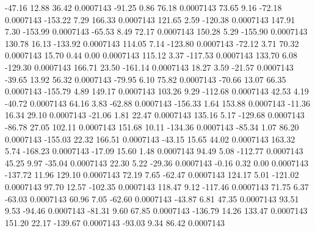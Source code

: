       -47.16       12.88       36.42     0.0007143
      -91.25        0.86       76.18     0.0007143
       73.65        9.16      -72.18     0.0007143
     -153.22        7.29      166.33     0.0007143
      121.65        2.59     -120.38     0.0007143
      147.91        7.30     -153.99     0.0007143
      -65.53        8.49       72.17     0.0007143
      150.28        5.29     -155.90     0.0007143
      130.78       16.13     -133.92     0.0007143
      114.05        7.14     -123.80     0.0007143
      -72.12        3.71       70.32     0.0007143
       15.70        0.44        0.00     0.0007143
      115.12        3.37     -117.53     0.0007143
      133.70        6.08     -129.30     0.0007143
      166.71       23.50     -161.14     0.0007143
       18.27        3.59      -21.57     0.0007143
      -39.65       13.92       56.32     0.0007143
      -79.95        6.10       75.82     0.0007143
      -70.66       13.07       66.35     0.0007143
     -155.79        4.89      149.17     0.0007143
      103.26        9.29     -112.68     0.0007143
       42.53        4.19      -40.72     0.0007143
       64.16        3.83      -62.88     0.0007143
     -156.33        1.64      153.88     0.0007143
      -11.36       16.34       29.10     0.0007143
      -21.06        1.81       22.47     0.0007143
      135.16        5.17     -129.68     0.0007143
      -86.78       27.05      102.11     0.0007143
      151.68       10.11     -134.36     0.0007143
      -85.34        1.07       86.20     0.0007143
     -155.03       22.32      166.51     0.0007143
      -43.15       15.65       44.02     0.0007143
      163.32        5.74     -168.23     0.0007143
      -17.09       15.60        1.48     0.0007143
       94.49        5.08     -112.77     0.0007143
       45.25        9.97      -35.04     0.0007143
       22.30        5.22      -29.36     0.0007143
       -0.16        0.32        0.00     0.0007143
     -137.72       11.96      129.10     0.0007143
       72.19        7.65      -62.47     0.0007143
      124.17        5.01     -121.02     0.0007143
       97.70       12.57     -102.35     0.0007143
      118.47        9.12     -117.46     0.0007143
       71.75        6.37      -63.03     0.0007143
       60.96        7.05      -62.60     0.0007143
      -43.87        6.81       47.35     0.0007143
       93.51        9.53      -94.46     0.0007143
      -81.31        9.60       67.85     0.0007143
     -136.79       14.26      133.47     0.0007143
      151.20       22.17     -139.67     0.0007143
      -93.03        9.34       86.42     0.0007143
